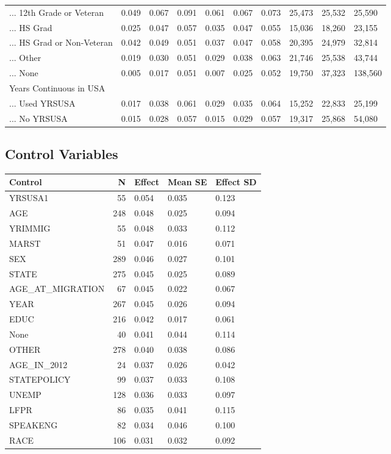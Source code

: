 \documentclass[
  letterpaper,
  DIV=11,
  numbers=noendperiod]{scrartcl}
\begin{document}
\begin{table}[!htbp]
{\begin{tabular}{llllllllll}
... 12th Grade or Veteran & 0.049 & 0.067 & 0.091 & 0.061 & 0.067 & 0.073 & 25,473 & 25,532 & 25,590 \\ 
... HS Grad & 0.025 & 0.047 & 0.057 & 0.035 & 0.047 & 0.055 & 15,036 & 18,260 & 23,155 \\ 
... HS Grad or Non-Veteran & 0.042 & 0.049 & 0.051 & 0.037 & 0.047 & 0.058 & 20,395 & 24,979 & 32,814 \\ 
... Other & 0.019 & 0.030 & 0.051 & 0.029 & 0.038 & 0.063 & 21,746 & 25,538 & 43,744 \\ 
... None & 0.005 & 0.017 & 0.051 & 0.007 & 0.025 & 0.052 & 19,750 & 37,323 & 138,560 \\ 
Years Continuous in USA &  &  &  &  &  &  &  &  &  \\ 
... Used YRSUSA & 0.017 & 0.038 & 0.061 & 0.029 & 0.035 & 0.064 & 15,252 & 22,833 & 25,199 \\ 
... No YRSUSA & 0.015 & 0.028 & 0.057 & 0.015 & 0.029 & 0.057 & 19,317 & 25,868 & 54,080\\ 
\hline
\hline
\end{tabular}
}
\end{table}

\hypertarget{control-variables}{%
\subsection{Control Variables}\label{control-variables}}

\begin{longtable}[]{@{}lrlll@{}}
\toprule\noalign{}
Control & N & Effect & Mean SE & Effect SD \\
\midrule\noalign{}
\endhead
\bottomrule\noalign{}
\endlastfoot
YRSUSA1 & 55 & 0.054 & 0.035 & 0.123 \\
AGE & 248 & 0.048 & 0.025 & 0.094 \\
YRIMMIG & 55 & 0.048 & 0.033 & 0.112 \\
MARST & 51 & 0.047 & 0.016 & 0.071 \\
SEX & 289 & 0.046 & 0.027 & 0.101 \\
STATE & 275 & 0.045 & 0.025 & 0.089 \\
AGE\_AT\_MIGRATION & 67 & 0.045 & 0.022 & 0.067 \\
YEAR & 267 & 0.045 & 0.026 & 0.094 \\
EDUC & 216 & 0.042 & 0.017 & 0.061 \\
None & 40 & 0.041 & 0.044 & 0.114 \\
OTHER & 278 & 0.040 & 0.038 & 0.086 \\
AGE\_IN\_2012 & 24 & 0.037 & 0.026 & 0.042 \\
STATEPOLICY & 99 & 0.037 & 0.033 & 0.108 \\
UNEMP & 128 & 0.036 & 0.033 & 0.097 \\
LFPR & 86 & 0.035 & 0.041 & 0.115 \\
SPEAKENG & 82 & 0.034 & 0.046 & 0.100 \\
RACE & 106 & 0.031 & 0.032 & 0.092 \\
\end{longtable}
\end{document}
